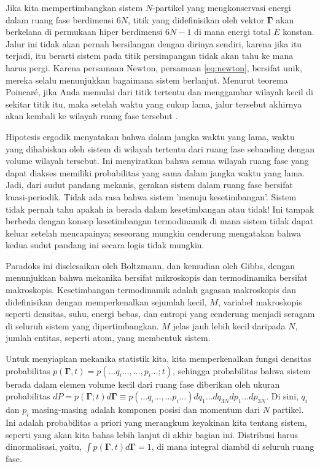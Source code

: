 \documentclass[a4paper,12pt]{book}
\begin{document}
Jika kita mempertimbangkan sistem $N$-partikel yang mengkonservasi energi dalam ruang fase berdimensi $6N$, titik yang didefinisikan oleh vektor $\mathbf{\Gamma}$ akan berkelana di permukaan hiper berdimensi $6N-1$ di mana energi total $E$ konstan. Jalur ini tidak akan pernah bersilangan dengan dirinya sendiri, karena jika itu terjadi, itu berarti sistem pada titik persimpangan tidak akan tahu ke mana harus pergi. Karena persamaan Newton, persamaan \eqref{eq:newton}, bersifat unik, mereka selalu menunjukkan bagaimana sistem berlanjut. Menurut teorema Poincaré, jika Anda memulai dari titik tertentu dan menggambar wilayah kecil di sekitar titik itu, maka setelah waktu yang cukup lama, jalur tersebut akhirnya akan kembali ke wilayah ruang fase tersebut \cite{uhlenbeck1963}.

Hipotesis ergodik menyatakan bahwa dalam jangka waktu yang lama, waktu yang dihabiskan oleh sistem di wilayah tertentu dari ruang fase sebanding dengan volume wilayah tersebut. Ini menyiratkan bahwa semua wilayah ruang fase yang dapat diakses memiliki probabilitas yang sama dalam jangka waktu yang lama. Jadi, dari sudut pandang mekanis, gerakan sistem dalam ruang fase bersifat kuasi-periodik. Tidak ada rasa bahwa sistem 'menuju kesetimbangan'. Sistem tidak pernah tahu apakah ia berada dalam kesetimbangan atau tidak! Ini tampak berbeda dengan konsep kesetimbangan termodinamik di mana sistem tidak dapat keluar setelah mencapainya; seseorang mungkin cenderung mengatakan bahwa kedua sudut pandang ini secara logis tidak mungkin.

Paradoks ini diselesaikan oleh Boltzmann, dan kemudian oleh Gibbs, dengan menunjukkan bahwa mekanika bersifat mikroskopis dan termodinamika bersifat makroskopis. Kesetimbangan termodinamik adalah gagasan makroskopis dan didefinisikan dengan memperkenalkan sejumlah kecil, $M$, variabel makroskopis seperti densitas, suhu, energi bebas, dan entropi yang cenderung menjadi seragam di seluruh sistem yang dipertimbangkan. $M$ jelas jauh lebih kecil daripada $N$, jumlah entitas, seperti atom, yang membentuk sistem.

Untuk menyiapkan mekanika statistik kita, kita memperkenalkan fungsi densitas probabilitas $p(\mathbf{\Gamma}, t) = p(\ldots q_i \ldots, \ldots, p_i \ldots; t)$, sehingga probabilitas bahwa sistem berada dalam elemen volume kecil dari ruang fase diberikan oleh ukuran probabilitas $dP = p(\mathbf{\Gamma}; t) d\mathbf{\Gamma} \equiv p(\ldots q_i \ldots, \ldots p_i \ldots) dq_1 \ldots dq_{3N} dp_1 \ldots dp_{3N}$. Di sini, $q_i$ dan $p_i$ masing-masing adalah komponen posisi dan momentum dari $N$ partikel. Ini adalah probabilitas a priori yang merangkum keyakinan kita tentang sistem, seperti yang akan kita bahas lebih lanjut di akhir bagian ini. Distribusi harus dinormalisasi, yaitu, $\int p(\mathbf{\Gamma}, t) d\mathbf{\Gamma} = 1$, di mana integral diambil di seluruh ruang fase.
\end{document}
